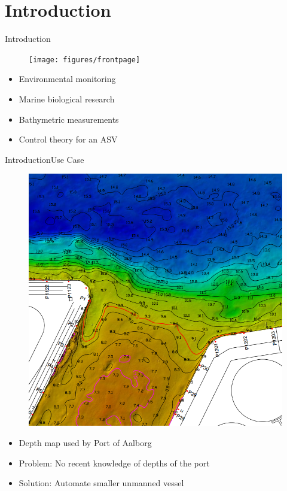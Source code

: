 \section{Introduction}

\begin{frame}{Introduction}{}
    \begin{figure}[H]
        \centering
        \texttt{[image: figures/frontpage]}
    \end{figure}
    \begin{itemize}
         \item Environmental monitoring
         \item Marine biological research
         \item Bathymetric measurements
         \item Control theory for an ASV
    \end{itemize}
\end{frame}

\begin{frame}{Introduction}{Use Case}
    \begin{figure}[H]
        \centering
        \includegraphics[width=.4\linewidth]{figures/smallDebthMapAalborg}
    \end{figure}
    \begin{itemize}
        \item Depth map used by Port of Aalborg 
        \item Problem: No recent knowledge of depths of the port
        \item Solution: Automate smaller unmanned vessel
    \end{itemize}
\end{frame}

